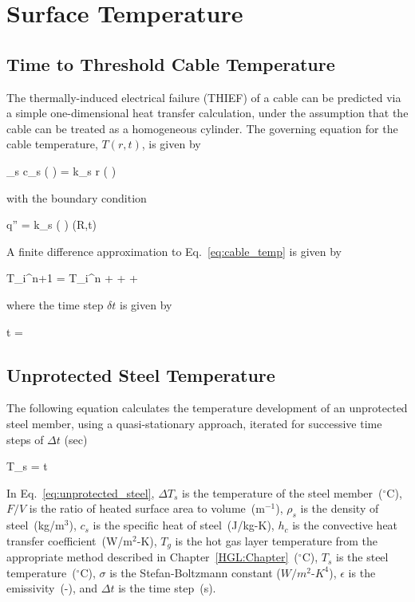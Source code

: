 \chapter{Surface Temperature}

\section{Time to Threshold Cable Temperature}

The thermally-induced electrical failure (THIEF) of a cable can be predicted via a simple
one-dimensional heat transfer calculation, under the assumption that the cable can be
treated as a homogeneous cylinder. The governing equation for the cable temperature,
$T(r,t)$, is given by

\be
\rho_s c_s \left(  \right) =   k_s r \left(  \right)
\label{eq:cable_temp}
\ee

\noindent with the boundary condition

\be
\dot q'' = k_s \left(  \right) (R,t)
\ee

\noindent A finite difference approximation to Eq.~\ref{eq:cable_temp} is given by

\be
T_i^{n+1} = T_i^n +  +  + 
\ee

\noindent where the time step $\delta t$ is given by

\be
\delta t = 
\ee


\clearpage


\section{Unprotected Steel Temperature}

The following equation calculates the temperature development of an unprotected steel member, using a quasi-stationary approach, iterated for successive time steps of $\Delta t$ (sec)

\be
\Delta T_s =    \Delta t
\label{eq:unprotected_steel}
\ee

In Eq.~\ref{eq:unprotected_steel}, $\Delta T_s$ is the temperature of the steel member~($^\circ$C), $F/V$ is the ratio of heated surface area to volume~(m$^{-1}$), $\rho_s$ is the density of steel~(kg/m$^3$), $c_s$ is the specific heat of steel~(J/kg-K), $h_c$ is the convective heat transfer coefficient~(W/m$^2$-K), $T_g$ is the hot gas layer temperature from the appropriate method described in Chapter~\ref{HGL:Chapter}~($^\circ$C), $T_s$ is the steel temperature~($^\circ$C), $\sigma$ is the Stefan-Boltzmann constant ($W/m^2$-$K^4$), $\epsilon$ is the emissivity~(-), and $\Delta t$ is the time step~(s).


